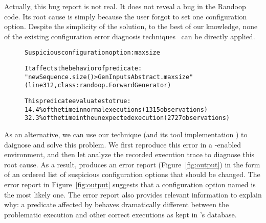 Actually, this bug report is not real. It does not reveal a bug
in the Randoop code. Its root cause is simply because
the user forgot to set one configuration option.
Despite the simplicity of the solution, to the best of our knowledge, none of the
existing configuration error diagnosis techniques~\cite{Attariyan:2008:UCD, 
Yuan:2011:COC, Su:2009:AGP, Whitaker:2004:CDS, Wang:2004:AMT,
Attariyan:2010:ACT, Rabkin:2011:PPC} can be directly applied.




\begin{figure}[t]
\begin{CodeOut}
\begin{alltt} 
Suspicious configuration option: maxsize

It affects the behavior of predicate:
"newSequence.size() > GenInputsAbstract.maxsize"
(line 312, class: randoop.ForwardGenerator) 

This predicate evaluates to true:
  14.4\% of the time in normal executions (1315 observations)
  32.3\% of the time in the unexpected execution (2727 observations)

\end{alltt}
\end{CodeOut}
\vspace*{-15pt}
\end{figure}

As an alternative, we can use our technique (and its tool implementation \ourtool)
to daignose and solve this problem. We first reproduce this
error in a \ourtool-enabled environment, and then let \ourtool analyze the
recorded execution trace to diagnose this root cause.
As a result, \ourtool produces
an error report (Figure~\ref{fig:output}) in the form of an ordered list of
suspicious configuration options that should be changed.
The error report in Figure~\ref{fig:output} suggests that
a configuration option named
 is the most likely one.
The error report also provides relevant 
information to explain why: %
a predicate affected by  behaves dramatically
different between the problematic execution and other correct executions 
as kept in \ourtool's database.


